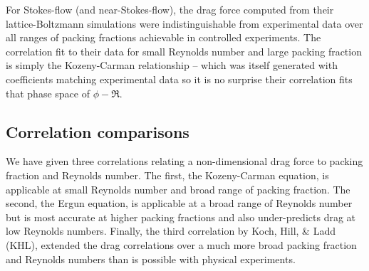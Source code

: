 For Stokes-flow (and near-Stokes-flow), the drag force computed from their lattice-Boltzmann simulations were indistinguishable from experimental data over all ranges of packing fractions achievable in controlled experiments. The correlation fit to their data for small Reynolds number and large packing fraction is simply the Kozeny-Carman relationship -- which was itself generated with coefficients matching experimental data so it is no surprise their correlation fits that phase space of $\phi-\Re$.

\subsection{Correlation comparisons}
We have given three correlations relating a non-dimensional drag force to packing fraction and Reynolds number. The first, the Kozeny-Carman equation, is applicable at small Reynolds number and broad range of packing fraction. The second, the Ergun equation, is applicable at a broad range of Reynolds number but is most accurate at higher packing fractions and also under-predicts drag at low Reynolds numbers. Finally, the third correlation by Koch, Hill, \& Ladd (KHL), extended the drag correlations over a much more broad packing fraction and Reynolds numbers than is possible with physical experiments. 

